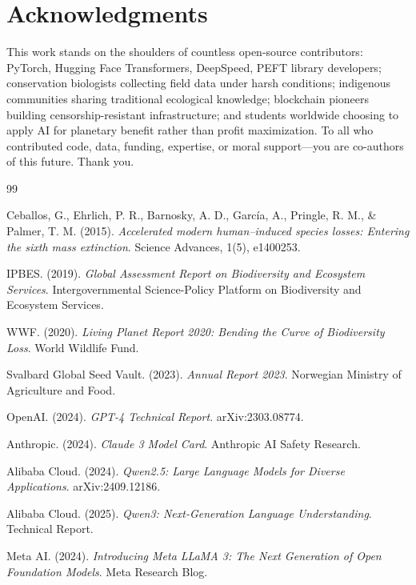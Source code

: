 \section*{Acknowledgments}


This work stands on the shoulders of countless open-source contributors: PyTorch, Hugging Face Transformers, DeepSpeed, PEFT library developers; conservation biologists collecting field data under harsh conditions; indigenous communities sharing traditional ecological knowledge; blockchain pioneers building censorship-resistant infrastructure; and students worldwide choosing to apply AI for planetary benefit rather than profit maximization. To all who contributed code, data, funding, expertise, or moral support—you are co-authors of this future. Thank you.


\begin{thebibliography}{99}

Ceballos, G., Ehrlich, P. R., Barnosky, A. D., García, A., Pringle, R. M., \& Palmer, T. M. (2015).
\textit{Accelerated modern human–induced species losses: Entering the sixth mass extinction}.
Science Advances, 1(5), e1400253.

IPBES. (2019).
\textit{Global Assessment Report on Biodiversity and Ecosystem Services}.
Intergovernmental Science-Policy Platform on Biodiversity and Ecosystem Services.

WWF. (2020).
\textit{Living Planet Report 2020: Bending the Curve of Biodiversity Loss}.
World Wildlife Fund.

Svalbard Global Seed Vault. (2023).
\textit{Annual Report 2023}.
Norwegian Ministry of Agriculture and Food.

OpenAI. (2024).
\textit{GPT-4 Technical Report}.
arXiv:2303.08774.

Anthropic. (2024).
\textit{Claude 3 Model Card}.
Anthropic AI Safety Research.

Alibaba Cloud. (2024).
\textit{Qwen2.5: Large Language Models for Diverse Applications}.
arXiv:2409.12186.

Alibaba Cloud. (2025).
\textit{Qwen3: Next-Generation Language Understanding}.
Technical Report.

Meta AI. (2024).
\textit{Introducing Meta LLaMA 3: The Next Generation of Open Foundation Models}.
Meta Research Blog.


\end{thebibliography}
